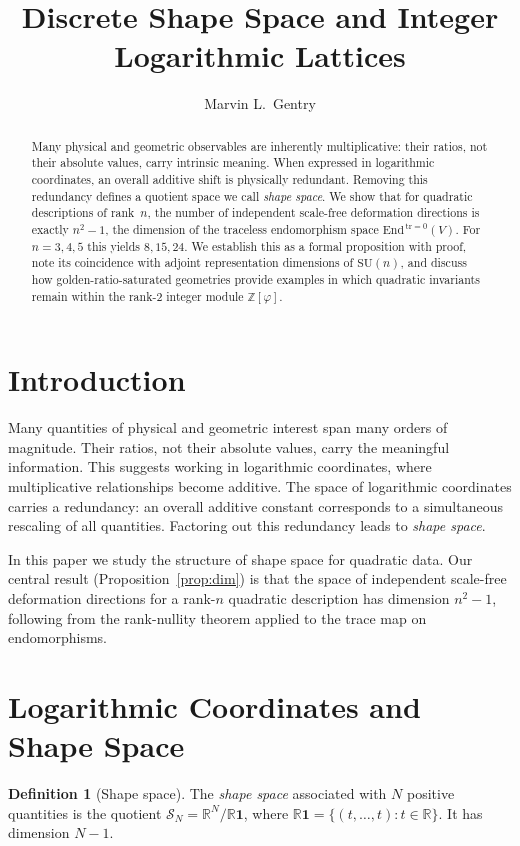 \documentclass[12pt]{article}
\title{Discrete Shape Space and Integer Logarithmic Lattices}
\author{Marvin L.\ Gentry}
\date{}
\theoremstyle{definition}
\newtheorem{definition}[theorem]{Definition}
\theoremstyle{remark}
\newcommand{\R}{\mathbb{R}}
\newcommand{\Z}{\mathbb{Z}}
\begin{document}
\maketitle

\begin{abstract}
Many physical and geometric observables are inherently multiplicative:
their ratios, not their absolute values, carry intrinsic meaning. When
expressed in logarithmic coordinates, an overall additive shift is
physically redundant. Removing this redundancy defines a quotient space
we call \emph{shape space}. We show that for quadratic descriptions of
rank~$n$, the number of independent scale-free deformation directions
is exactly $n^2-1$, the dimension of the traceless endomorphism space
$\mathrm{End}^{\,\mathrm{tr}=0}(V)$. For $n=3,4,5$ this yields $8,15,24$.
We establish this as a formal proposition with proof, note its coincidence
with adjoint representation dimensions of $\mathrm{SU}(n)$, and discuss
how golden-ratio-saturated geometries provide examples in which quadratic
invariants remain within the rank-2 integer module $\Z[\varphi]$.
\end{abstract}

\section{Introduction}

Many quantities of physical and geometric interest span many orders of
magnitude. Their ratios, not their absolute values, carry the meaningful
information. This suggests working in logarithmic coordinates, where
multiplicative relationships become additive. The space of logarithmic
coordinates carries a redundancy: an overall additive constant corresponds
to a simultaneous rescaling of all quantities. Factoring out this redundancy
leads to \emph{shape space}.

In this paper we study the structure of shape space for quadratic data.
Our central result (Proposition~\ref{prop:dim}) is that the space of
independent scale-free deformation directions for a rank-$n$ quadratic
description has dimension $n^2-1$, following from the rank-nullity theorem
applied to the trace map on endomorphisms.

\section{Logarithmic Coordinates and Shape Space}

\begin{definition}[Shape space]\label{def:shapespace}
The \emph{shape space} associated with $N$ positive quantities is the
quotient $\mathcal{S}_N=\R^N/\R\mathbf{1}$, where
$\R\mathbf{1}=\{(t,\ldots,t):t\in\R\}$. It has dimension $N-1$.
\end{definition}
\end{document}
